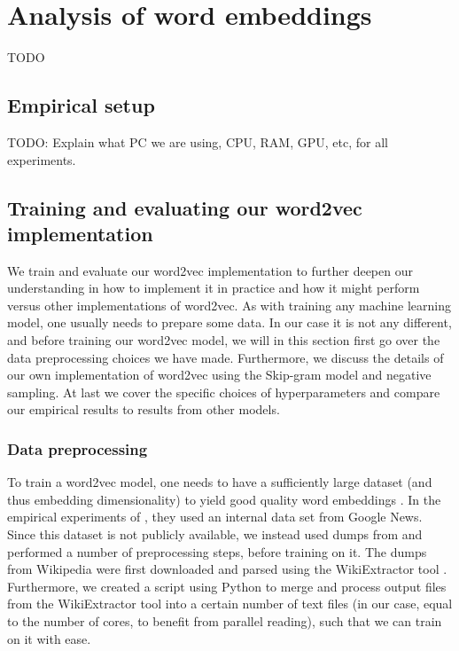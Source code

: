 \chapter{Analysis of word embeddings}
TODO

\section{Empirical setup}
TODO: Explain what PC we are using, CPU, RAM, GPU, etc, for all experiments.

\section{Training and evaluating our word2vec implementation}
\label{sec:training-and-eval-our-word2vec-impl}
We train and evaluate our word2vec implementation to further deepen our understanding in how to implement it in practice and how it might perform versus other implementations of word2vec. As with training any machine learning model, one usually needs to prepare some data. In our case it is not any different, and before training our word2vec model, we will in this section first go over the data preprocessing choices we have made. Furthermore, we discuss the details of our own implementation of word2vec using the Skip-gram model and negative sampling. At last we cover the specific choices of hyperparameters and compare our empirical results to results from other models.

\subsection{Data preprocessing}
\label{sec:data-preprocessing}
To train a word2vec model, one needs to have a sufficiently large dataset (and thus embedding dimensionality) to yield good quality word embeddings \cite{mikolov2013b}. In the empirical experiments of \cite{mikolov2013b}, they used an internal data set from Google News. Since this dataset is not publicly available, we instead used dumps from \cite{WikimediaDumps} and performed a number of preprocessing steps, before training on it. The dumps from Wikipedia were first downloaded and parsed using the WikiExtractor tool \cite{Wikiextractor2015}. Furthermore, we created a script using Python \cite{python3-2009} to merge and process output files from the WikiExtractor tool into a certain number of text files (in our case, equal to the number of cores, to benefit from parallel reading), such that we can train on it with ease.


